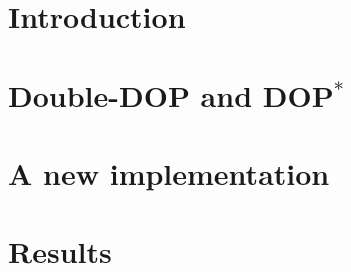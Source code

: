 \documentclass{article}
\begin{document}
\section{Introduction}

\section{Double-DOP and DOP$^*$}

\section{A new implementation}

\section{Results}
\end{document}
